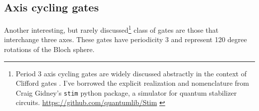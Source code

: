 

\subsection{Axis cycling gates}
Another interesting, but rarely discussed\footnote{Period 3 axis cycling gates are widely discussed abstractly in the context of Clifford gates . I've borrowed the explicit realization and nomenclature from 
Craig Gidney's \texttt{stim} python package, a simulator for quantum stabilizer circuits. \url{https://github.com/quantumlib/Stim} \cite{Gidney2021a}} class of gates are those that interchange three axes. These gates have periodicity 3 and represent 120 degree rotations of the Bloch sphere.

